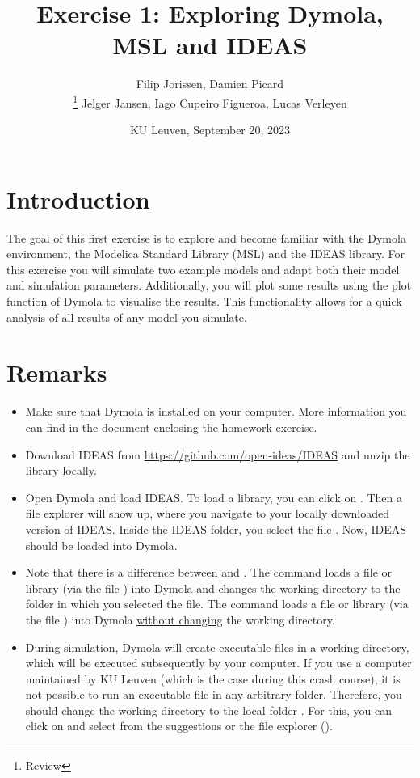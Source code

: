 \documentclass[10pt,a4paper]{article}
\begin{document}
\title{Exercise 1: Exploring Dymola, MSL and IDEAS}
\author{Filip Jorissen, Damien Picard \\  \thanks{Review} Jelger Jansen, Iago Cupeiro Figueroa, Lucas Verleyen}
\date{KU Leuven, September 20, 2023}
\maketitle


\doclicenseThis


\section*{Introduction}
The goal of this first exercise is to explore and become familiar with the Dymola environment, the Modelica Standard Library (MSL) and the IDEAS library. For this exercise you will simulate two example models and adapt both their model and simulation parameters. Additionally, you will plot some results using the plot function of Dymola to visualise the results. This functionality allows for a quick analysis of all results of any model you simulate. 


\section*{Remarks}
 
\begin{itemize}
	\item Make sure that Dymola is installed on your computer. More information you can find in the document enclosing the homework exercise.
	\item Download IDEAS from \href{https://github.com/open-ideas/IDEAS}{https://github.com/open-ideas/IDEAS} and unzip the library locally.
	\item Open Dymola and load IDEAS. To load a library, you can click on . Then a file explorer will show up, where you navigate to your locally downloaded version of IDEAS. Inside the IDEAS folder, you select the file . Now, IDEAS should be loaded into Dymola.
	\item Note that there is a difference between  and . The command  loads a file or library (via the file ) into Dymola \underline{and changes} the working directory to the folder in which you selected the file. The command  loads a file or library (via the file ) into Dymola \underline{without changing} the working directory.
	\item During simulation, Dymola will create executable files in a working directory, which will be executed subsequently by your computer. If you use a computer maintained by KU Leuven (which is the case during this crash course), it is not possible to run an executable file in any arbitrary folder. Therefore, you should change the working directory to the local folder . For this, you can click on  and select  from the suggestions or the file explorer ().
\end{itemize}
\end{document}
